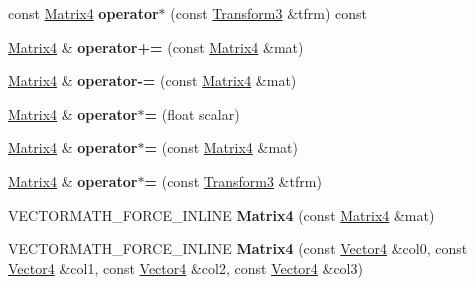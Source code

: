 \begin{DoxyCompactItemize}
const \hyperlink{classVectormath_1_1Aos_1_1Matrix4}{Matrix4} {\bfseries operator$\ast$} (const \hyperlink{classVectormath_1_1Aos_1_1Transform3}{Transform3} \&tfrm) const
\item 
\mbox{\label{classVectormath_1_1Aos_1_1Matrix4_a865d078ab0129afc6da7d8f0ffdc96f0}} 
\hyperlink{classVectormath_1_1Aos_1_1Matrix4}{Matrix4} \& {\bfseries operator+=} (const \hyperlink{classVectormath_1_1Aos_1_1Matrix4}{Matrix4} \&mat)
\item 
\mbox{\label{classVectormath_1_1Aos_1_1Matrix4_aa7d2c8b36904893da4d9c1df8db9d851}} 
\hyperlink{classVectormath_1_1Aos_1_1Matrix4}{Matrix4} \& {\bfseries operator-\/=} (const \hyperlink{classVectormath_1_1Aos_1_1Matrix4}{Matrix4} \&mat)
\item 
\mbox{\label{classVectormath_1_1Aos_1_1Matrix4_a5aab373e0ca5f9e0dccc54271d4fbde3}} 
\hyperlink{classVectormath_1_1Aos_1_1Matrix4}{Matrix4} \& {\bfseries operator$\ast$=} (float scalar)
\item 
\mbox{\label{classVectormath_1_1Aos_1_1Matrix4_ae4155b47e518f43e036b92a17cb93ec4}} 
\hyperlink{classVectormath_1_1Aos_1_1Matrix4}{Matrix4} \& {\bfseries operator$\ast$=} (const \hyperlink{classVectormath_1_1Aos_1_1Matrix4}{Matrix4} \&mat)
\item 
\mbox{\label{classVectormath_1_1Aos_1_1Matrix4_afab4864e33c43c4e610b2ed1041c49be}} 
\hyperlink{classVectormath_1_1Aos_1_1Matrix4}{Matrix4} \& {\bfseries operator$\ast$=} (const \hyperlink{classVectormath_1_1Aos_1_1Transform3}{Transform3} \&tfrm)
\item 
\mbox{\label{classVectormath_1_1Aos_1_1Matrix4_ab1f5a51a2e0d533dd04e1645e9f1f9de}} 
V\+E\+C\+T\+O\+R\+M\+A\+T\+H\+\_\+\+F\+O\+R\+C\+E\+\_\+\+I\+N\+L\+I\+NE {\bfseries Matrix4} (const \hyperlink{classVectormath_1_1Aos_1_1Matrix4}{Matrix4} \&mat)
\item 
\mbox{\label{classVectormath_1_1Aos_1_1Matrix4_af3386f64d6e060f56a9cc5597d634f83}} 
V\+E\+C\+T\+O\+R\+M\+A\+T\+H\+\_\+\+F\+O\+R\+C\+E\+\_\+\+I\+N\+L\+I\+NE {\bfseries Matrix4} (const \hyperlink{classVectormath_1_1Aos_1_1Vector4}{Vector4} \&col0, const \hyperlink{classVectormath_1_1Aos_1_1Vector4}{Vector4} \&col1, const \hyperlink{classVectormath_1_1Aos_1_1Vector4}{Vector4} \&col2, const \hyperlink{classVectormath_1_1Aos_1_1Vector4}{Vector4} \&col3)

\end{DoxyCompactItemize}
